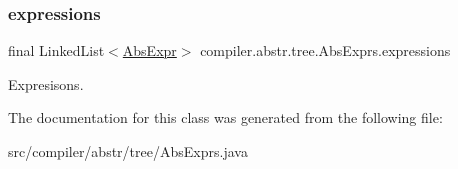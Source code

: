 \subsubsection{\texorpdfstring{expressions}{expressions}}
{\footnotesize\ttfamily final Linked\+List$<$\hyperlink{classcompiler_1_1abstr_1_1tree_1_1expr_1_1_abs_expr}{Abs\+Expr}$>$ compiler.\+abstr.\+tree.\+Abs\+Exprs.\+expressions}

Expresisons. 

The documentation for this class was generated from the following file\+:\begin{DoxyCompactItemize}
\item 
src/compiler/abstr/tree/Abs\+Exprs.\+java\end{DoxyCompactItemize}
